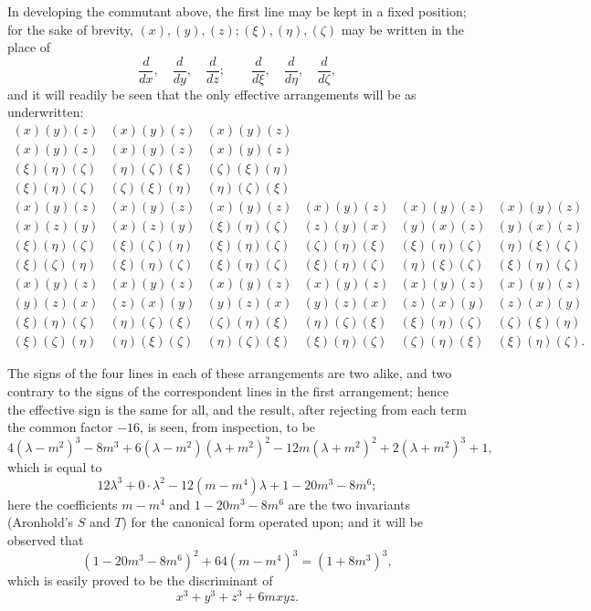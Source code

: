 \documentclass[11pt]{article}
\newcommand{\sourcepage}[1]{\marginpar{\scriptsize p.~#1}}
\begin{document}
{{In developing the commutant above, the first line may be kept in a fixed position; for the sake of brevity, $(x),(y),(z);(\xi),(\eta),(\zeta)$ may be written in the place of
\[
\frac{d}{dx},\quad\frac{d}{dy},\quad\frac{d}{dz};\qquad
\frac{d}{d\xi},\quad\frac{d}{d\eta},\quad\frac{d}{d\zeta},
\]
and it will readily be seen that the only effective arrangements will be as underwritten:
{\scriptsize
\[
\begin{array}{cccccc}
(x)(y)(z)&(x)(y)(z)&(x)(y)(z)&&&\\
(x)(y)(z)&(x)(y)(z)&(x)(y)(z)&&&\\
(\xi)(\eta)(\zeta)&(\eta)(\zeta)(\xi)&(\zeta)(\xi)(\eta)&&&\\
(\xi)(\eta)(\zeta)&(\zeta)(\xi)(\eta)&(\eta)(\zeta)(\xi)&&&\\[0.35em]
(x)(y)(z)&(x)(y)(z)&(x)(y)(z)&(x)(y)(z)&(x)(y)(z)&(x)(y)(z)\\
(x)(z)(y)&(x)(z)(y)&(\xi)(\eta)(\zeta)&(z)(y)(x)&(y)(x)(z)&(y)(x)(z)\\
(\xi)(\eta)(\zeta)&(\xi)(\zeta)(\eta)&(\xi)(\eta)(\zeta)&(\zeta)(\eta)(\xi)&(\xi)(\eta)(\zeta)&(\eta)(\xi)(\zeta)\\
(\xi)(\zeta)(\eta)&(\xi)(\eta)(\zeta)&(\xi)(\eta)(\zeta)&(\xi)(\eta)(\zeta)&(\eta)(\xi)(\zeta)&(\xi)(\eta)(\zeta)\\[0.35em]
(x)(y)(z)&(x)(y)(z)&(x)(y)(z)&(x)(y)(z)&(x)(y)(z)&(x)(y)(z)\\
(y)(z)(x)&(z)(x)(y)&(y)(z)(x)&(y)(z)(x)&(z)(x)(y)&(z)(x)(y)\\
(\xi)(\eta)(\zeta)&(\eta)(\zeta)(\xi)&(\zeta)(\eta)(\xi)&(\eta)(\zeta)(\xi)&(\xi)(\eta)(\zeta)&(\zeta)(\xi)(\eta)\\
(\xi)(\zeta)(\eta)&(\eta)(\xi)(\zeta)&(\eta)(\zeta)(\xi)&(\xi)(\eta)(\zeta)&(\zeta)(\eta)(\xi)&(\xi)(\eta)(\zeta).
\end{array}
\]
}

\sourcepage{311}
The signs of the four lines in each of these arrangements are two alike, and two contrary to the signs of the correspondent lines in the first arrangement; hence the effective sign is the same for all, and the result, after rejecting from each term the common factor $-16$, is seen, from inspection, to be
\[
4(\lambda-m^2)^3-8m^3+6(\lambda-m^2)(\lambda+m^2)^2-12m(\lambda+m^2)^2
+2(\lambda+m^2)^3+1,
\]
which is equal to
\[
12\lambda^3+0\cdot\lambda^2-12(m-m^4)\lambda+1-20m^3-8m^6;
\]
here the coefficients $m-m^4$ and $1-20m^3-8m^6$ are the two invariants (Aronhold's $S$ and $T$) for the canonical form operated upon; and it will be observed that
\[
(1-20m^3-8m^6)^2+64(m-m^4)^3=(1+8m^3)^3,
\]
which is easily proved to be the discriminant of
\[
x^3+y^3+z^3+6mxyz.
\]

}}
\end{document}
